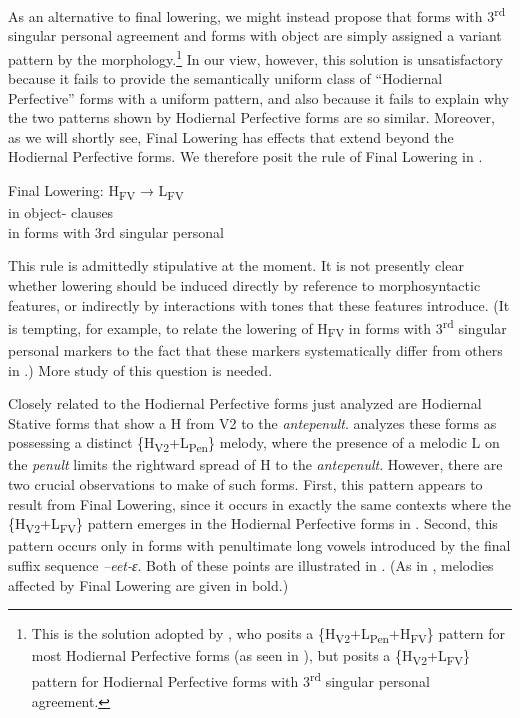 \documentclass[output=paper,newtxmath,modfonts,nonflat,hidelinks]{langsci/langscibook}
\begin{document}
As an alternative to final lowering, we might instead propose that forms with 3\textsuperscript{rd} singular personal agreement and forms with object  are simply assigned a variant  pattern by the morphology.\footnote{This
  is the solution adopted by \citet{Roberts-Kohno2014}, who posits a \{H\textsubscript{V2}+L\textsubscript{Pen}+H\textsubscript{FV}\} pattern for most Hodiernal Perfective forms (as seen in ), but posits a \{H\textsubscript{V2}+L\textsubscript{FV}\} pattern for Hodiernal Perfective forms with 3\textsuperscript{rd} singular personal agreement.}
In our view, however, this solution is unsatisfactory because it fails to provide the semantically uniform class of “Hodiernal Perfective” forms with a uniform  pattern, and also because it fails to explain why the two  patterns shown by Hodiernal Perfective forms are so similar. Moreover, as we will shortly see, Final Lowering has effects that extend beyond the Hodiernal Perfective forms. We therefore posit the rule of Final Lowering in .

\ea\label{ex:jones:7}
Final Lowering: H\textsubscript{FV} → L\textsubscript{FV} \\
\ea\label{ex:jones:7a}
in object- clauses\\
\ex\label{ex:jones:7b}
in forms with 3rd singular personal  \\
\z
\z


This rule is admittedly stipulative at the moment. It is not presently clear whether lowering should be induced directly by reference to morphosyntactic features, or indirectly by interactions with tones that these features introduce. (It is tempting, for example, to relate the lowering of H\textsubscript{FV} in forms with 3\textsuperscript{rd} singular personal  markers to the fact that these markers systematically differ from others in .) More study of this question is needed.

Closely related to the Hodiernal Perfective forms just analyzed are Hodiernal Stative forms that show a H  from V2 to the \textit{antepenult}. \citet{Roberts-Kohno2014} analyzes these forms as possessing a distinct \{H\textsubscript{V2}+L\textsubscript{Pen}\} melody, where the presence of a melodic L on the \textit{penult} limits the rightward spread of H to the \textit{antepenult}. However, there are two crucial observations to make of such forms. First, this  pattern appears to result from Final Lowering, since it occurs in exactly the same contexts where the \{H\textsubscript{V2}+L\textsubscript{FV}\} pattern emerges in the Hodiernal Perfective forms in . Second, this pattern occurs only in forms with penultimate long vowels introduced by the final suffix sequence \textit{–eet-ɛ}. Both of these points are illustrated in . (As in , melodies affected by Final Lowering are given in bold.)
\end{document}
